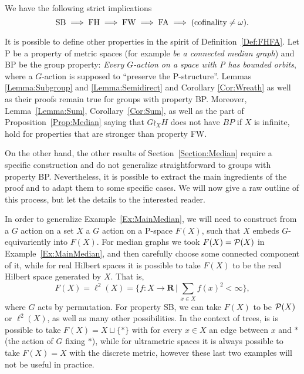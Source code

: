 We have the following strict implications \cite{MR1432323,MR0476875 ,MR3299841,2013arXiv1302.5982C}
\[
\textnormal{SB}\implies \textnormal{FH}\implies \textnormal{FW}\implies \textnormal{FA}\implies(\textnormal{cofinality}\neq\omega).
\]

It is possible to define other properties in the spirit of Definition~\ref{Def:FHFA}.
Let P be a property of metric spaces (for example \emph{be a connected median graph}) and BP be the group property: \emph{Every $G$-action on a space with P has bounded orbits}, where a $G$-action is supposed to ``preserve the P-structure''.
Lemmas \ref{Lemma:Subgroup} and \ref{Lemma:Semidirect} and Corollary \ref{Cor:Wreath} as well as their proofs remain true for groups with property BP.
Moreover, Lemma~\ref{Lemma:Sum}, Corollary~\ref{Cor:Sum}, as well as the part of Proposition~\ref{Prop:Median} saying that $G\wr_XH$ does not have $BP$ if $X$ is infinite, hold for properties that are stronger than property FW. 

On the other hand, the other results of Section~\ref{Section:Median} require a specific construction and do not generalize straightforward to groups with property BP.
Nevertheless, it is possible to extract the main ingredients of the proof and to adapt them to some specific cases.
We will now give a raw outline of this process, but let the details to the interested reader.

In order to generalize Example~\ref{Ex:MainMedian}, we will need to construct from a $G$ action on a set $X$ a $G$ action on a P-space $F(X)$,
such that $X$ embeds $G$-equivariently into $F(X)$.
For median graphs we took $F(X)=\mathcal P(X)$ in Example~\ref{Ex:MainMedian}, and then carefully choose some connected component of it, while for real Hilbert spaces it is possible to take $F(X)$ to be the real Hilbert space generated by $X$. That is, 
\[F(X)=\ell^2(X)=\bigg\{f\colon X\to \mathbf R\,\bigg|\, \sum_{x\in X}f(x)^2<\infty\bigg\},\]
where $G$ acts by permutation.
For property SB, we can take $F(X)$ to be  $\mathcal P(X)$ or $\ell^2(X)$, as well as many other possibilities.
In the context of trees, is is possible to take $F(X)=X\sqcup\{*\}$ with for every $x\in X$ an edge between $x$ and $*$ (the action of $G$ fixing $*$), while for ultrametric spaces it is always possible to take $F(X)=X$ with the discrete metric, however these last two examples will not be useful in practice.

